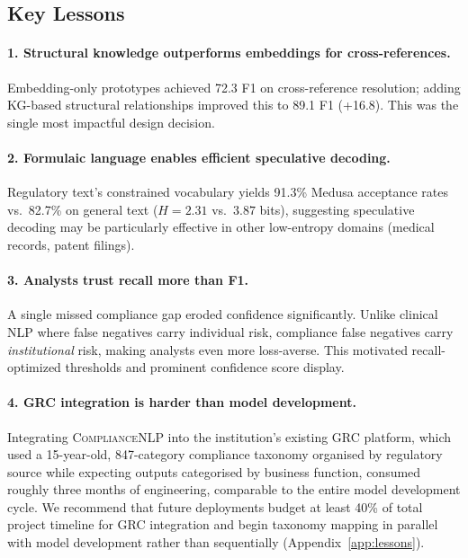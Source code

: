 \documentclass[11pt]{article}
\begin{document}
\subsection{Key Lessons}

\paragraph{1. Structural knowledge outperforms embeddings for cross-references.} Embedding-only prototypes achieved 72.3 F1 on cross-reference resolution; adding KG-based structural relationships improved this to 89.1 F1 (+16.8). This was the single most impactful design decision.

\paragraph{2. Formulaic language enables efficient speculative decoding.} Regulatory text's constrained vocabulary yields 91.3\% Medusa acceptance rates vs.\ 82.7\% on general text ($H{=}2.31$ vs.\ $3.87$ bits), suggesting speculative decoding may be particularly effective in other low-entropy domains (medical records, patent filings).

\paragraph{3. Analysts trust recall more than F1.} A single missed compliance gap eroded confidence significantly. Unlike clinical NLP where false negatives carry individual risk, compliance false negatives carry \emph{institutional} risk, making analysts even more loss-averse. This motivated recall-optimized thresholds and prominent confidence score display.

\paragraph{4. GRC integration is harder than model development.} Integrating \textsc{ComplianceNLP} into the institution's existing GRC platform, which used a 15-year-old, 847-category compliance taxonomy organised by regulatory source while expecting outputs categorised by business function, consumed roughly three months of engineering, comparable to the entire model development cycle. We recommend that future deployments budget at least 40\% of total project timeline for GRC integration and begin taxonomy mapping in parallel with model development rather than sequentially (Appendix~\ref{app:lessons}).
\end{document}
